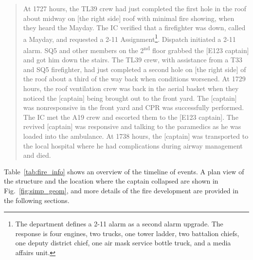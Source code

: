 \begin{quote}
At 1727 hours, the TL39 crew had just completed the first hole in the roof about midway on [the right side] roof with minimal fire showing, when they heard the Mayday. The IC verified that a firefighter was down, called a Mayday, and requested a 2-11 Assignment\footnote{The department defines a 2-11 alarm as a second alarm upgrade. The response is four engines, two trucks, one tower ladder, two battalion chiefs, one deputy district chief, one air mask service bottle truck, and a media affairs unit.}. Dispatch initiated a 2-11 alarm. SQ5 and other members on the 2\textsuperscript{nd} floor grabbed the [E123 captain] and got him down the stairs. The TL39 crew, with assistance from a T33 and SQ5 firefighter, had just completed a second hole on [the right side] of the roof about a third of the way back when conditions worsened. At 1729 hours, the roof ventilation crew was back in the aerial basket when they noticed the [captain] being brought out to the front yard. The [captain] was nonresponsive in the front yard and CPR was successfully performed. The IC met the A19 crew and escorted them to the [E123 captain]. The revived [captain] was responsive and talking to the paramedics as he was loaded into the ambulance. At 1738 hours, the [captain] was transported to the local hospital where he had complications during airway management and died.
\end{quote}

\noindent Table~\ref{tab:fire_info} shows an overview of the timeline of events. A plan view of the structure and the location where the captain collapsed are shown in Fig.~\ref{fig:simp_geom}, and more details of the fire development are provided in the following sections.

